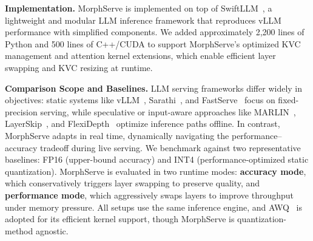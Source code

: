 \documentclass{article}
\newcommand{\system}{{MorphServe}\xspace}
\begin{document}
{\textbf{Implementation.}
{\system} is implemented on top of SwiftLLM~\cite{jiang2024neo_swiftLLM, swiftllm_github_repo}, a lightweight and modular LLM inference framework that reproduces vLLM~\cite{kwon2023efficient_vllm} performance with simplified components. 
We added approximately 2,200 lines of Python and 500 lines of C++/CUDA to support {\system}’s optimized KVC management and attention kernel extensions, which enable efficient layer swapping and KVC resizing at runtime.  

\textbf{Comparison Scope and Baselines.} LLM serving frameworks differ widely in objectives: static systems like vLLM~\cite{kwon2023efficient_vllm}, Sarathi~\cite{agrawal2023sarathi}, and FastServe~\cite {wu2023fastserve} focus on fixed-precision serving, while speculative or input-aware approaches like MARLIN~\cite{frantar2025marlin_mixed_precision}, LayerSkip~\cite{Elhoushi_2024}, and FlexiDepth~\cite{luo2025adaptive} optimize inference paths offline. In contrast, MorphServe adapts in real time, dynamically navigating the performance–accuracy tradeoff during live serving. We benchmark against two representative baselines: FP16 (upper-bound accuracy) and INT4 (performance-optimized static quantization). MorphServe is evaluated in two runtime modes: \textbf{accuracy mode}, which conservatively triggers layer swapping to preserve quality, and \textbf{performance mode}, which aggressively swaps layers to improve throughput under memory pressure. All setups use the same inference engine, and AWQ~\cite{lin2024awq} is adopted for its efficient kernel support, though MorphServe is quantization-method agnostic.



}
\end{document}
